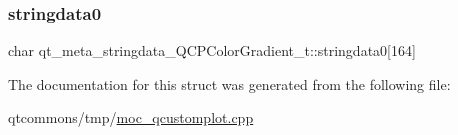 \subsubsection{\texorpdfstring{stringdata0}{stringdata0}}
{\footnotesize\ttfamily char qt\+\_\+meta\+\_\+stringdata\+\_\+\+Q\+C\+P\+Color\+Gradient\+\_\+t\+::stringdata0\mbox{[}164\mbox{]}}



The documentation for this struct was generated from the following file\+:\begin{DoxyCompactItemize}
\item 
qtcommons/tmp/\mbox{\hyperlink{moc__qcustomplot_8cpp}{moc\+\_\+qcustomplot.\+cpp}}\end{DoxyCompactItemize}
